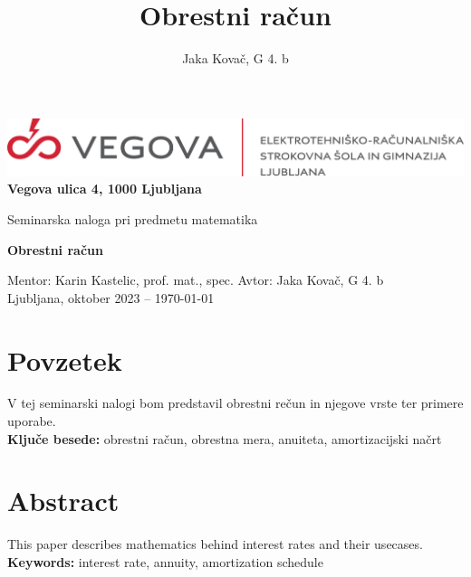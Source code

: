 \documentclass[12pt]{article}
\title{Obrestni račun}
\author{Jaka Kovač, G 4. b}
\begin{document}

\begin{center}
    \thispagestyle{empty}
    \includegraphics[scale=1]{slike/logotip_vegova_leze_brezokvirja.png}
    \\
    \textbf{Vegova ulica 4, 1000 Ljubljana}

    \vspace{\fill} 
    Seminarska naloga pri predmetu matematika

    \Huge{\textbf{Obrestni račun}}

    \normalsize
    \vspace{\fill}

    Mentor: Karin Kastelic, prof. mat., spec. \hfill Avtor: Jaka Kovač, G 4. b\\
    \null
    Ljubljana, oktober 2023 – \MMYYYYdate\today 
\end{center}
\newpage
\thispagestyle{empty}
\null
\newpage

\section*{Povzetek}
V tej seminarski nalogi bom predstavil obrestni rečun in njegove vrste ter primere uporabe.
\\ %
\textbf{Ključe besede:} obrestni račun, obrestna mera, anuiteta, amortizacijski načrt

\vfill
\section*{Abstract}
\foreignlanguage{english}{This paper describes mathematics behind interest rates and their
usecases.
\\ %
\textbf{Keywords:} interest rate, annuity, amortization schedule}
\vfill

\newpage
\thispagestyle{empty} %
\tableofcontents %

\end{document}
